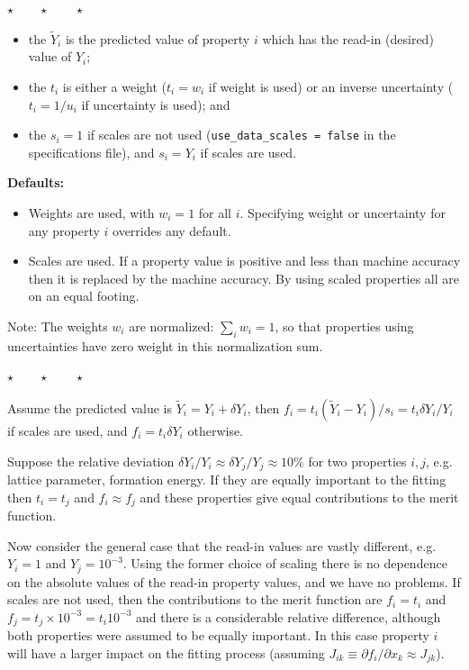 \documentclass[a4paper,12pt,pdftex,onecolumn]{article}
\newcommand{\stars}{\begin{center}%
\vspace{1em plus 0.5em minus 0.5em}%
$\star \qquad \star \qquad \star$%
\vspace{1em plus 0.5em minus 0.5em}%
\end{center}}
\begin{document}
\stars



\begin{itemize}
\item the $\widetilde{Y}_i$ is the predicted value of property $i$
which has the read-in (desired) value of $Y_i$;
\item the $t_i$ is either a weight ($t_i=w_i$ if weight is used)
or an inverse uncertainty ($t_i=1/u_i$ if uncertainty is used); and
\item the $s_i = 1$ if scales are not used (\verb+use_data_scales = false+ in the
specifications file), and $s_i = Y_i$ if scales are used.
\end{itemize}

\textbf{Defaults:}
\begin{itemize}
\item
Weights are used, with $w_i=1$ for all $i$. Specifying weight or uncertainty for
any property $i$ overrides any default.
\item 
Scales are used. If a property value is positive and less than machine accuracy
then it is replaced by the machine accuracy.
By using scaled properties all are on an equal footing.
\end{itemize}

Note: The weights $w_i$ are normalized: $\sum_i w_i = 1$,
so that properties using uncertainties have zero weight in this normalization sum.

\stars

Assume the predicted value is $\widetilde{Y}_i = Y_i + \delta Y_i$, then
$f_i = t_i (\widetilde{Y}_i - Y_i)/s_i = t_i \delta Y_i / Y_i$ if scales are used, and
$f_i = t_i \delta Y_i$ otherwise.

Suppose the relative deviation $\delta Y_i/Y_i \approx \delta Y_j/Y_j \approx 10\%$
for two properties $i,j$,
e.g. lattice parameter, formation energy.
If they are equally important to the fitting then $t_i=t_j$ and $f_i \approx f_j$
and these properties give equal contributions to the
merit function.

Now consider the general case that the read-in values
are vastly different, e.g. $Y_i = 1$ and $Y_j = 10^{-3}$.
Using the former choice of scaling there is no dependence on the absolute values of
the read-in property values, and we have no problems.
If scales are not used, then the contributions to the merit function are
$f_i = t_i$ and $f_j = t_j \times 10^{-3} = t_i 10^{-3}$ and there is a considerable
relative difference, although both properties were assumed to be equally
important. In this case property $i$ will have a larger impact on the
fitting process (assuming $J_{ik} \equiv \partial f_i / \partial x_k \approx J_{jk}$).
\end{document}
